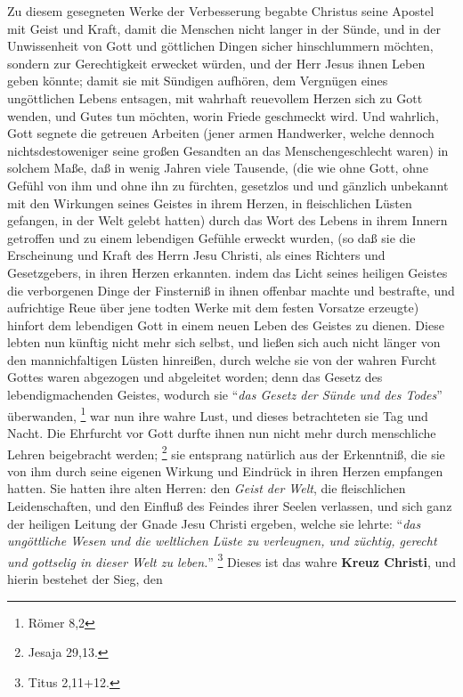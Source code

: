 Zu diesem gesegneten Werke der Verbesserung begabte Christus seine Apostel mit
Geist und Kraft, damit die Menschen nicht langer in der Sünde, und in der
Unwissenheit von Gott und göttlichen Dingen sicher hinschlummern möchten,
sondern zur Gerechtigkeit erwecket würden, und der Herr Jesus ihnen Leben geben
könnte; damit sie mit Sündigen aufhören, dem Vergnügen eines ungöttlichen Lebens
entsagen, mit wahrhaft reuevollem Herzen sich zu Gott wenden, und Gutes tun
möchten, worin Friede geschmeckt wird. Und wahrlich, Gott segnete die getreuen
Arbeiten (jener armen Handwerker, welche dennoch nichtsdestoweniger seine
großen Gesandten an das Menschengeschlecht waren) in solchem Maße, daß in
wenig Jahren viele Tausende, (die wie ohne Gott, ohne Gefühl von ihm und ohne ihn
zu fürchten, gesetzlos und und gänzlich unbekannt mit den Wirkungen seines
Geistes in ihrem Herzen, in fleischlichen Lüsten gefangen, in der Welt gelebt
hatten) durch das Wort des Lebens in ihrem Innern getroffen und zu einem
lebendigen Gefühle erweckt wurden, (so daß sie die Erscheinung und Kraft des
Herrn Jesu Christi, als eines Richters und Gesetzgebers, in ihren Herzen
erkannten. indem das Licht seines heiligen Geistes die verborgenen Dinge der
Finsterniß in ihnen offenbar machte und bestrafte, und aufrichtige Reue über
jene todten Werke mit dem festen Vorsatze erzeugte) hinfort dem lebendigen Gott
in einem neuen Leben des Geistes zu dienen. Diese lebten nun künftig nicht mehr
sich selbst, und ließen sich auch nicht länger von den mannichfaltigen Lüsten
hinreißen, durch welche sie von der wahren Furcht Gottes waren abgezogen und
abgeleitet worden; denn das Gesetz des lebendigmachenden Geistes, wodurch sie
"`\textit{das Gesetz der Sünde und des Todes}"' überwanden,
\footnote{Römer 8,2}  war nun
ihre wahre Lust, und dieses betrachteten sie Tag und Nacht. Die Ehrfurcht vor
Gott durfte ihnen nun nicht mehr durch menschliche Lehren beigebracht werden;
\footnote{Jesaja 29,13.}  sie entsprang
natürlich aus der Erkenntniß, die sie von
ihm durch seine eigenen Wirkung und Eindrück in ihren Herzen empfangen
hatten. Sie hatten ihre alten Herren: den \textit{Geist der Welt}, die
fleischlichen
Leidenschaften, und den Einfluß des Feindes ihrer Seelen verlassen, und sich
ganz der heiligen Leitung der Gnade Jesu Christi ergeben, welche sie lehrte:
"`\textit{das ungöttliche Wesen und die weltlichen Lüste zu verleugnen, und
züchtig, gerecht und gottselig in dieser Welt zu leben.}"'
\footnote{Titus 2,11+12.} 
Dieses ist das wahre \textbf{Kreuz Christi}, und hierin bestehet der Sieg, den
